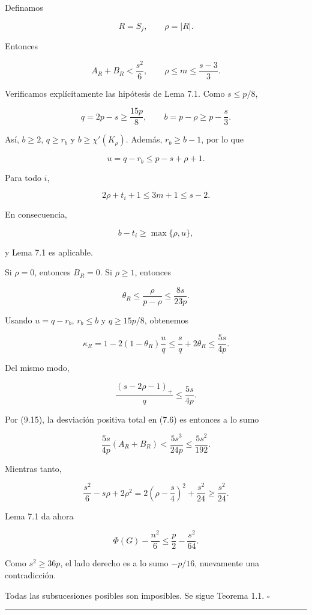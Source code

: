\documentclass[
  spanish,
  11pt,
  a4paper,
]{article}
\begin{document}
Definamos

\[
R=S_j,
\qquad
\rho=|R|.
\]

Entonces

\[
A_R+B_R<\frac{s^2}{6},
\qquad
\rho\le m\le\frac{s-3}{3}.
\tag{9.15}
\]

Verificamos explícitamente las hipótesis de Lema 7.1. Como \(s\le p/8\),

\[
q=2p-s\ge\frac{15p}{8},
\qquad
b=p-\rho\ge p-\frac s3.
\]

Así, \(b\ge2\), \(q\ge r_b\) y \(b\ge\chi'(K_\rho)\). Además, \(r_b\ge b-1\), por lo que

\[
u=q-r_b\le p-s+\rho+1.
\]

Para todo \(i\),

\[
2\rho+t_i+1
\le
3m+1
\le
s-2.
\]

En consecuencia,

\[
b-t_i\ge\max\{\rho,u\},
\]

y Lema 7.1 es aplicable.

Si \(\rho=0\), entonces \(B_R=0\). Si \(\rho\ge1\), entonces

\[
\theta_R
\le
\frac{\rho}{p-\rho}
\le
\frac{8s}{23p}.
\]

Usando \(u=q-r_b\), \(r_b\le b\) y \(q\ge15p/8\), obtenemos

\[
\kappa_R
=1-2(1-\theta_R)\frac uq
\le
\frac sq+2\theta_R
\le
\frac{5s}{4p}.
\tag{9.16}
\]

Del mismo modo,

\[
\frac{(s-2\rho-1)_+}{q}
\le
\frac{5s}{4p}.
\tag{9.17}
\]

Por (9.15), la desviación positiva total en (7.6) es entonces a lo sumo

\[
\frac{5s}{4p}(A_R+B_R)
<
\frac{5s^3}{24p}
\le
\frac{5s^2}{192}.
\tag{9.18}
\]

Mientras tanto,

\[
\frac{s^2}{6}-s\rho+2\rho^2
=
2\left(\rho-\frac s4\right)^2+\frac{s^2}{24}
\ge
\frac{s^2}{24}.
\tag{9.19}
\]

Lema 7.1 da ahora

\[
\Phi(G)-\frac{n^2}{6}
\le
\frac p2-\frac{s^2}{64}.
\tag{9.20}
\]

Como \(s^2\ge36p\), el lado derecho es a lo sumo \(-p/16\), nuevamente una contradicción.

Todas las subsucesiones posibles son imposibles. Se sigue Teorema 1.1. \(\square\)

\begin{center}\rule{0.5\linewidth}{0.5pt}\end{center}
\end{document}
